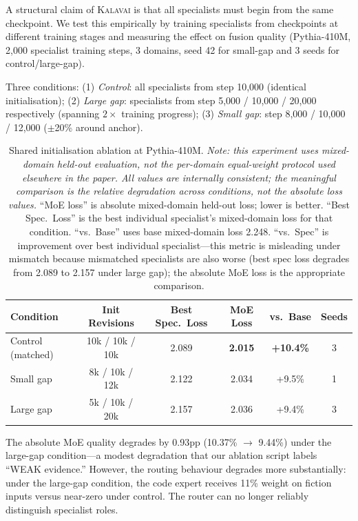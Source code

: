 \documentclass{article}
\newcommand{\kalavai}{\textsc{Kalavai}\xspace}
\begin{document}
A structural claim of \kalavai is that all specialists must begin from the same checkpoint. We test this empirically by training specialists from checkpoints at different training stages and measuring the effect on fusion quality (Pythia-410M, 2,000 specialist training steps, 3 domains, seed 42 for small-gap and 3 seeds for control/large-gap).

Three conditions: (1) \emph{Control}: all specialists from step 10,000 (identical initialisation); (2) \emph{Large gap}: specialists from step 5,000 / 10,000 / 20,000 respectively (spanning $2\times$ training progress); (3) \emph{Small gap}: step 8,000 / 10,000 / 12,000 ($\pm$20\% around anchor).

\begin{table}[h]
\centering
\caption{Shared initialisation ablation at Pythia-410M. \emph{Note: this experiment uses mixed-domain held-out evaluation, not the per-domain equal-weight protocol used elsewhere in the paper. All values are internally consistent; the meaningful comparison is the relative degradation across conditions, not the absolute loss values.} ``MoE loss'' is absolute mixed-domain held-out loss; lower is better. ``Best Spec.\ Loss'' is the best individual specialist's mixed-domain loss for that condition. ``vs.\ Base'' uses base mixed-domain loss 2.248. ``vs.\ Spec'' is improvement over best individual specialist---this metric is misleading under mismatch because mismatched specialists are also worse (best spec loss degrades from 2.089 to 2.157 under large gap); the absolute MoE loss is the appropriate comparison.}
\label{tab:sharedinit}
\begin{tabular}{lccccc}
\toprule
\textbf{Condition} & \textbf{Init Revisions} & \textbf{Best Spec.\ Loss} & \textbf{MoE Loss} & \textbf{vs.\ Base} & \textbf{Seeds} \\
\midrule
Control (matched)  & 10k / 10k / 10k         & 2.089          & \textbf{2.015} & \textbf{+10.4\%} & 3 \\
Small gap          & 8k / 10k / 12k          & 2.122          & 2.034          & +9.5\%           & 1 \\
Large gap          & 5k / 10k / 20k          & 2.157          & 2.036          & +9.4\%           & 3 \\
\bottomrule
\end{tabular}
\end{table}

The absolute MoE quality degrades by 0.93pp (10.37\% $\rightarrow$ 9.44\%) under the large-gap condition---a modest degradation that our ablation script labels ``WEAK evidence.'' However, the routing behaviour degrades more substantially: under the large-gap condition, the code expert receives 11\% weight on fiction inputs versus near-zero under control. The router can no longer reliably distinguish specialist roles.
\end{document}

